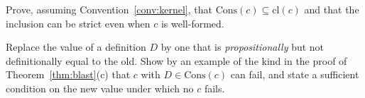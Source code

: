\begin{exercise}
Prove, assuming Convention~\ref{conv:kernel}, that $\mathrm{Cons}(c)\subseteq\mathrm{cl}(c)$ and that the inclusion can be strict even when $c$ is well-formed.
\end{exercise}

\begin{exercise}
Replace the value of a definition $D$ by one that is \emph{propositionally} but not definitionally equal to the old. Show by an example of the kind in the proof of Theorem~\ref{thm:blast}(c) that $c$ with $D\in\mathrm{Cons}(c)$ can fail, and state a sufficient condition on the new value under which no $c$ fails.
\end{exercise}
